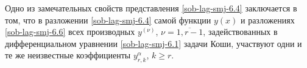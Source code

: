 Одно из замечательных свойств представления \eqref{sob-lag-smj-6.4} заключается в том, что в разложении \eqref{sob-lag-smj-6.4} самой функции $y(x)$ и разложениях \eqref{sob-lag-smj-6.6} всех производных $y^{(\nu)}$, $\nu=\overline{1,r-1}$, задействованных в дифференциальном уравнении \eqref{sob-lag-smj-6.1} задачи Коши, участвуют одни и те же неизвестные коэффициенты $y^\alpha_{r,k}$, $k \ge r$.




